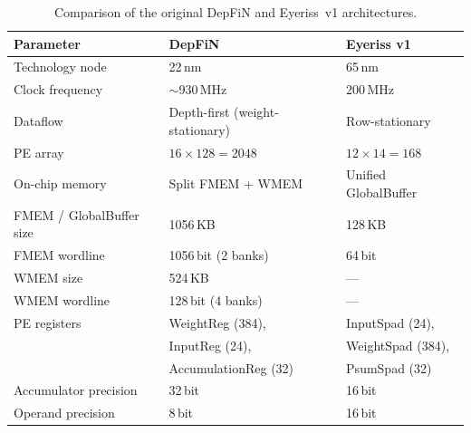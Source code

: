\begin{table}[htbp]
  \centering
  \caption{Comparison of the original DepFiN and Eyeriss~v1 architectures.}
  \label{tab:orig-arch-comparison}
  \small
  \begin{tabular}{l l l}
    \toprule
    \textbf{Parameter}          & \textbf{DepFiN}                      & \textbf{Eyeriss v1}                 \\
    \midrule
    Technology node              & 22\,nm                               & 65\,nm                              \\
    Clock frequency              & $\sim$930\,MHz                       & 200\,MHz                            \\
    Dataflow                     & Depth-first (weight-stationary)      & Row-stationary                      \\
    PE array                     & $16 \times 128 = 2048$               & $12 \times 14 = 168$                \\
    \addlinespace
    On-chip memory               & Split FMEM + WMEM                    & Unified GlobalBuffer                \\
    FMEM / GlobalBuffer size     & 1056\,KB                             & 128\,KB                             \\
    FMEM wordline                & 1056\,bit (2 banks)                  & 64\,bit                             \\
    WMEM size                    & 524\,KB                              & ---                                 \\
    WMEM wordline                & 128\,bit (4 banks)                   & ---                                 \\
    \addlinespace
    PE registers                 & WeightReg (384),                     & InputSpad (24),                     \\
                                 & InputReg (24),                       & WeightSpad (384),                   \\
                                 & AccumulationReg (32)                 & PsumSpad (32)                       \\
    Accumulator precision        & 32\,bit                              & 16\,bit                             \\
    Operand precision            & 8\,bit                               & 16\,bit                             \\

\end{tabular}
\end{table}
